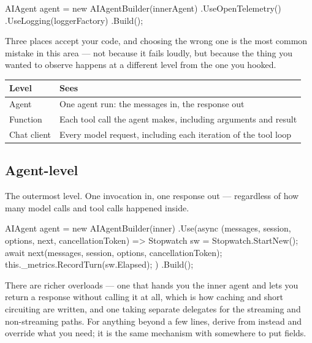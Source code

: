 \begin{csharp}[caption={The builder}, label={lst:obs-builder}]
AIAgent agent = new AIAgentBuilder(innerAgent)
    .UseOpenTelemetry()
    .UseLogging(loggerFactory)
    .Build();
\end{csharp}

Three places accept your code, and choosing the wrong one is the most common
mistake in this area --- not because it fails loudly, but because the thing you
wanted to observe happens at a different level from the one you hooked.

\begin{center}
\small
\begin{tabularx}{\linewidth}{@{}lX@{}}
\toprule
\textbf{Level} & \textbf{Sees} \\
\midrule
Agent & One agent run: the messages in, the response out \\[4pt]
Function & Each tool call the agent makes, including arguments and result \\[4pt]
Chat client & Every model request, including each iteration of the tool loop \\
\bottomrule
\end{tabularx}
\end{center}

\subsection{Agent-level}

The outermost level. One invocation in, one response out --- regardless of how
many model calls and tool calls happened inside.

\begin{csharp}[caption={Agent middleware from a delegate}, label={lst:obs-agent-mw}]
AIAgent agent = new AIAgentBuilder(inner)
    .Use(async (messages, session, options, next, cancellationToken) =>
    {
        Stopwatch sw = Stopwatch.StartNew();
        await next(messages, session, options, cancellationToken);
        this._metrics.RecordTurn(sw.Elapsed);
    })
    .Build();
\end{csharp}

There are richer overloads --- one that hands you the inner agent and lets you
return a response without calling it at all, which is how caching and short
circuiting are written, and one taking separate delegates for the streaming and
non-streaming paths. For anything beyond a few lines, derive from
 instead and override what you need; it is the same
mechanism with somewhere to put fields.

